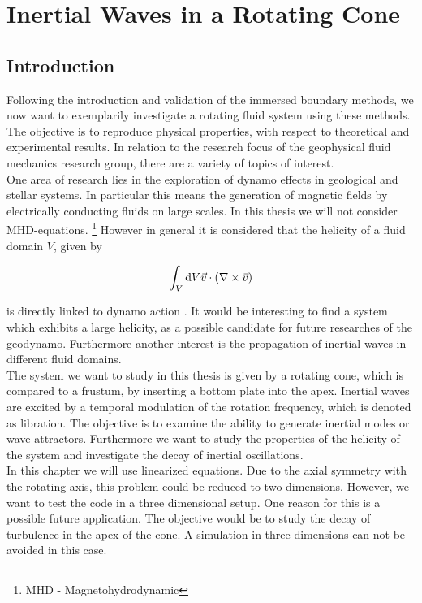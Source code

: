 \chapter{Inertial Waves in a Rotating Cone}

\section{Introduction}

Following the introduction and validation of the immersed boundary methods,
we now want to exemplarily investigate a rotating fluid system using these methods.
The objective is to reproduce  physical properties, with respect to theoretical and experimental results.
In relation to the research focus of the geophysical fluid mechanics research group, there are a variety
of topics of interest.\\
One area of research lies in the exploration of dynamo effects in geological and stellar systems.
In particular this means the generation of magnetic fields by electrically conducting fluids on large scales.
In this thesis we will not consider MHD-equations.  \footnote{MHD - Magnetohydrodynamic}
However in general it is considered that the helicity of a fluid domain $V$, given by

\begin{align}
    \int_{V}\mathop{}\!\mathrm{d} V  \vec{v} \cdot \left( \nabla \times \vec{v} \right)
\end{align}

is directly linked to dynamo action \citep{moffat1978}.
It would be interesting to find a system which exhibits a large helicity,
as a possible candidate for future researches of the geodynamo.
Furthermore another interest is the propagation of inertial waves in different fluid domains.\\
The system we want to study in this thesis is given by a rotating cone, which is compared to
a frustum, by inserting a bottom plate into the apex.
Inertial waves are excited by a temporal modulation of the rotation frequency, which is denoted as libration.
The objective is to examine the ability to generate inertial modes or wave attractors.
Furthermore we want to study the properties of the helicity of the system and investigate the
decay of inertial oscillations.\\
In this chapter we will use linearized equations. Due to the axial symmetry with the rotating axis,
this problem could be reduced to two dimensions.
However, we want to test the code in a three dimensional setup.
One reason for this is a possible future application.
The objective would be to study the decay of turbulence in the apex of the cone.
A simulation in three dimensions can not be avoided in this case.


